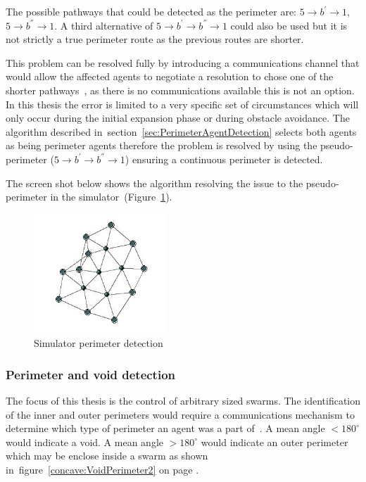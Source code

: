 The possible pathways that could be detected as the perimeter are: $5 \rightarrow b^{'} \rightarrow 1$, $5 \rightarrow b^{''} \rightarrow 1$. A third alternative of $5 \rightarrow b^{'} \rightarrow b^{''} \rightarrow 1$ could also be used but it is not strictly a true perimeter route as the previous routes are shorter.  

This problem can be resolved fully by introducing a communications channel that would allow the affected agents to negotiate a resolution to chose one of the shorter pathways~\cite{MD:09}, as there is no communications available this is not an option. In this thesis the error is limited to a very specific set of circumstances which will only occur during the initial expansion phase or during obstacle avoidance. The algorithm described in~section~\ref{sec:PerimeterAgentDetection} selects both agents as being perimeter agents therefore the problem is resolved by using the pseudo-perimeter ($5 \rightarrow b^{'} \rightarrow b^{''} \rightarrow 1$) ensuring a continuous perimeter is detected. 

The screen shot below shows the algorithm resolving the issue to the pseudo-perimeter in the simulator~(Figure~\ref{reduced:PerimeterAnomaly}).

\begin{figure}[H]
\begin{center}
\includegraphics[width=5cm]{CHAPTER-6/figures/PerimeterAnomaly}
\end{center}
\caption{Simulator perimeter detection\label{reduced:PerimeterAnomaly}}
\end{figure}

\subsubsection{Perimeter and void detection}\label{sec:PerimeterVoidDetection} 
The focus of this thesis is the control of arbitrary sized swarms. The identification of the inner and outer perimeters would require a communications mechanism to determine which type of perimeter an agent was a part of~\cite{ZAPS:07,MD:09}. A mean angle $< 180^\circ$ would indicate a void. A mean angle $> 180^\circ$ would indicate an outer perimeter which may be enclose inside a swarm as shown in~figure~\ref{concave:VoidPerimeter2} on page \pageref{concave:VoidPerimeter2}.  

